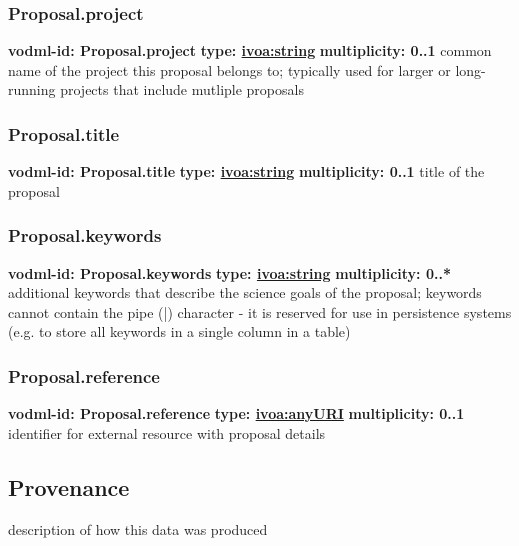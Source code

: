     \subsubsection{Proposal.project}
      \textbf{vodml-id: Proposal.project} \newline
      \textbf{type: \hyperref[sect:ivoa]{ivoa:string}} \newline
      \textbf{multiplicity: 0..1} \newline
      common name of the project this proposal belongs to; typically used for larger or long-running projects that include mutliple proposals

    \subsubsection{Proposal.title}
      \textbf{vodml-id: Proposal.title} \newline
      \textbf{type: \hyperref[sect:ivoa]{ivoa:string}} \newline
      \textbf{multiplicity: 0..1} \newline
      title of the proposal

    \subsubsection{Proposal.keywords}
      \textbf{vodml-id: Proposal.keywords} \newline
      \textbf{type: \hyperref[sect:ivoa]{ivoa:string}} \newline
      \textbf{multiplicity: 0..*} \newline
      additional keywords that describe the science goals of the proposal; keywords cannot contain the pipe (|) character - it is reserved for use in persistence systems (e.g. to store all keywords in a single column in a table)

    \subsubsection{Proposal.reference}
      \textbf{vodml-id: Proposal.reference} \newline
      \textbf{type: \hyperref[sect:ivoa]{ivoa:anyURI}} \newline
      \textbf{multiplicity: 0..1} \newline
      identifier for external resource with proposal details

  \subsection{Provenance}
  \label{sect:Provenance}
    description of how this data was produced

